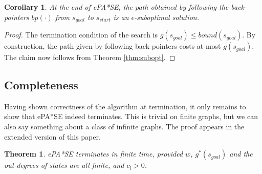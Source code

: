 \documentclass[letterpaper]{article}
\newtheorem{thm}{Theorem}
\newtheorem{cor}{Corollary}
\begin{document}
\begin{cor}
\label{cor:subopt}
At the end of ePA*SE, the path obtained by following the back-pointers $bp(\cdot)$ from $s_{goal}$ to $s_{start}$ is an $\epsilon$-suboptimal solution.
\end{cor}

\begin{proof}
The termination condition of the search is $g(s_{goal}) \le bound(s_{goal})$. By construction, the path given by following back-pointers costs at most $g(s_{goal})$. The claim now follows from Theorem \ref{thm:subopt}.
\end{proof}

\subsection{Completeness}

Having shown correctness of the algorithm at termination, it only remains to show that ePA*SE indeed terminates. This is trivial on finite graphs, but we can also say something about a class of infinite graphs. The proof appears in the extended version of this paper.

\begin{thm}
\label{thm:complete}
ePA*SE terminates in finite time, provided $w$, $g^*(s_{goal})$ and the out-degrees of states are all finite, and $c_l > 0$.
\end{thm}
\end{document}
